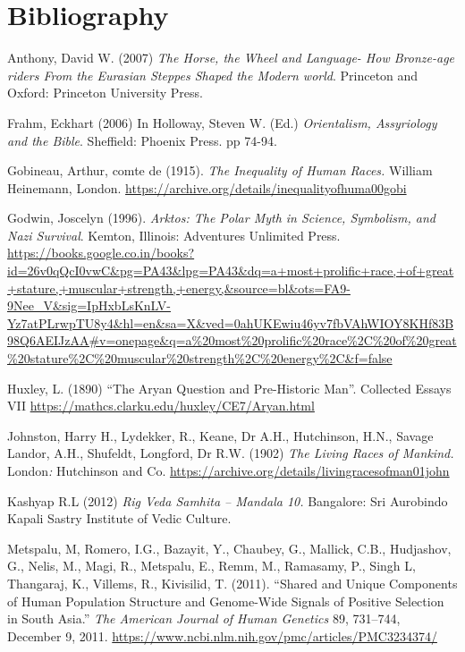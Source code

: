 \section*{Bibliography}

\begin{thebibliography}{99}
 Anthony, David W. (2007) \textit{The Horse, the Wheel and Language- How Bronze-age riders From the Eurasian Steppes Shaped the Modern world}. Princeton and Oxford: Princeton University Press.

  Frahm, Eckhart (2006) In Holloway, Steven W. (Ed.) \textit{Orientalism, Assyriology and the Bible}. Sheffield: Phoenix Press. pp 74-94.

  Gobineau, Arthur, comte de (1915). \textit{The Inequality of Human Races. }William Heinemann, London. \url{https://archive.org/details/inequalityofhuma00gobi}

  Godwin, Joscelyn (1996). \textit{Arktos: The Polar Myth in Science, Symbolism, and Nazi Survival}. Kemton, Illinois: Adventures Unlimited Press. \url{https://books.google.co.in/books?id=26v0qQcI0vwC&pg=PA43&lpg=PA43&dq=a+most+prolific+race,+of+great+stature,+muscular+strength,+energy,&source=bl&ots=FA9-9Nee_V&sig=IpHxbLsKnLV-Yz7atPLrwpTU8y4&hl=en&sa=X&ved=0ahUKEwiu46yv7fbVAhWIOY8KHf83B98Q6AEIJzAA#v=onepage&q=a%20most%20prolific%20race%2C%20of%20great%20stature%2C%20muscular%20strength%2C%20energy%2C&f=false}

  Huxley, L. (1890) “The Aryan Question and Pre-Historic Man”. Collected Essays VII \url{https://mathcs.clarku.edu/huxley/CE7/Aryan.html}

  Johnston, Harry H., Lydekker, R., Keane, Dr A.H., Hutchinson, H.N., Savage Landor, A.H., Shufeldt, Longford, Dr R.W. (1902) \textit{The Living Races of Mankind. }London\textit{:} Hutchinson and Co. \url{ https://archive.org/details/livingracesofman01john}

  Kashyap R.L (2012) \textit{Rig Veda Samhita – Mandala 10. }Bangalore: Sri Aurobindo Kapali Sastry Institute of Vedic Culture.

  Metspalu, M, Romero, I.G., Bazayit, Y., Chaubey, G., Mallick, C.B., Hudjashov, G., Nelis, M., Magi, R., Metspalu, E., Remm, M., Ramasamy, P., Singh L, Thangaraj, K., Villems, R., Kivisilid, T. (2011). “Shared and Unique Components of Human Population Structure and Genome-Wide Signals of Positive Selection in South Asia.” \textit{The American Journal of Human Genetics} 89, 731–744, December 9, 2011. \url{https://www.ncbi.nlm.nih.gov/pmc/articles/PMC3234374/}


\end{thebibliography}
